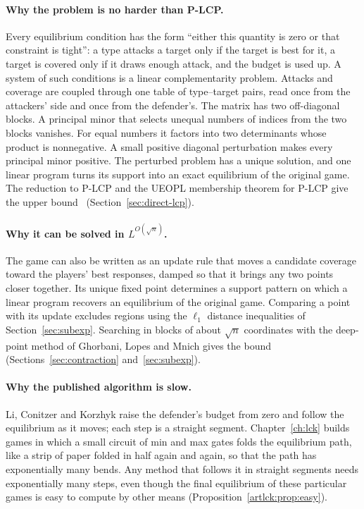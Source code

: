 \paragraph{Why the problem is no harder than P-LCP.} Every equilibrium condition has the form ``either
this quantity is zero or that constraint is tight'': a type attacks a target only if the target is best
for it, a target is covered only if it draws enough attack, and the budget is used up. A system of such
conditions is a linear complementarity problem. Attacks and coverage are coupled through one table of
type--target pairs, read once from the attackers' side and once from the defender's. The matrix has two
off-diagonal blocks. A principal minor that selects unequal numbers of indices from the two blocks
vanishes. For equal numbers it factors into two determinants whose product is nonnegative.
A small positive diagonal perturbation makes every principal minor positive. The perturbed problem
has a unique solution, and one linear program turns its support into an exact equilibrium of the
original game. The reduction to P-LCP and the UEOPL
membership theorem for P-LCP give the upper bound~\cite{fgms18}
(Section~\ref{sec:direct-lcp}).

\paragraph{Why it can be solved in $L^{O(\sqrt n)}$.} The game can also be written as an update rule
that moves a candidate coverage toward the players' best responses, damped so that it brings any two
points closer together. Its unique fixed point determines a support
pattern on which a linear program recovers an equilibrium of the original
game. Comparing a point with its update excludes regions using the
$\ell_1$ distance inequalities of Section~\ref{sec:subexp}.
Searching in blocks of about $\sqrt n$ coordinates
with the deep-point method of Ghorbani, Lopes and Mnich gives the bound
(Sections~\ref{sec:contraction} and~\ref{sec:subexp}).

\paragraph{Why the published algorithm is slow.} Li, Conitzer and Korzhyk raise the defender's budget
from zero and follow the equilibrium as it moves; each step is a straight segment. Chapter~\ref{ch:lck}
builds games in which a small circuit of min and max gates folds the equilibrium path, like a strip of
paper folded in half again and again, so that the path has exponentially many bends. Any method that
follows it in straight segments needs exponentially many steps, even though the final equilibrium of
these particular games is easy to compute by other means (Proposition~\ref{artlck:prop:easy}).

